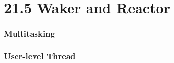 \section{21.5 Waker and Reactor} %
\begin{frame}[fragile]
    \frametitle{Multitasking}
\end{frame}
% 
% 
% 
% 
% 
% 
\begin{frame}[fragile]
    \frametitle{User-level Thread}
\end{frame}
% 
% 
% 
% 
% 
% 
